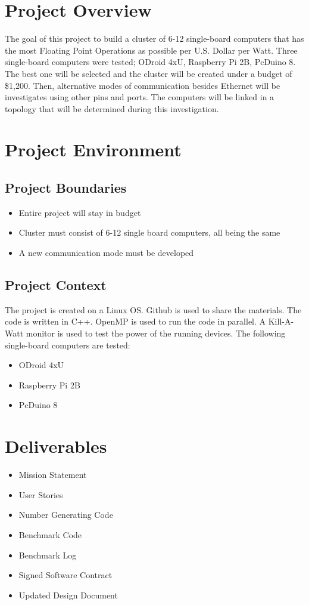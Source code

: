 \documentclass{article}
\begin{document}
\section*{Project Overview}
The goal of this project to build a cluster of 6-12 single-board computers that has the most Floating Point Operations as possible per U.S. Dollar per Watt. Three single-board computers were tested; ODroid 4xU, Raspberry Pi 2B, PcDuino 8. The best one will be selected and the cluster will be created under a budget of \$1,200. Then, alternative modes of communication besides Ethernet will be investigates using other pins and ports. The computers will be linked in a topology that will be determined during this investigation.

\section*{Project Environment}
\subsection*{Project Boundaries}
\begin{itemize}
	\item Entire project will stay in budget
	\item Cluster must consist of 6-12 single board computers, all being the same
	\item A new communication mode must be developed
\end{itemize}
\subsection*{Project Context}
The project is created on a Linux OS. Github is used to share the materials. The code is written in C++. OpenMP is used to run the code in parallel. A Kill-A-Watt monitor is used to test the power of the running devices.
\newline \newline The following single-board computers are tested:
\begin{itemize}
	\item ODroid 4xU
	\item Raspberry Pi 2B
	\item PcDuino 8
\end{itemize} 

\section*{Deliverables}
\begin{itemize}
	\item Mission Statement
	\item User Stories
	\item Number Generating Code
	\item Benchmark Code
	\item Benchmark Log
	\item Signed Software Contract
	\item Updated Design Document
\end{itemize}
\end{document}
